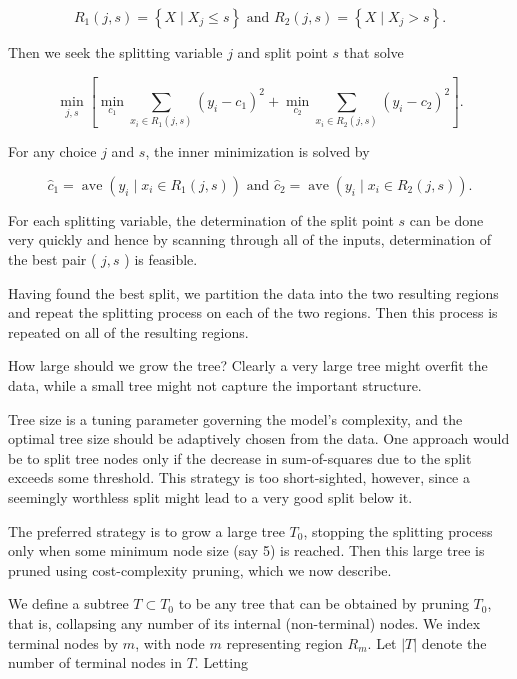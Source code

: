 \documentclass[10pt]{article}
\begin{document}
\begin{equation*}
R_{1}(j, s)=\left\{X \mid X_{j} \leq s\right\} \text { and } R_{2}(j, s)=\left\{X \mid X_{j}>s\right\} . \tag{9.12}
\end{equation*}


Then we seek the splitting variable $j$ and split point $s$ that solve


\begin{equation*}
\min _{j, s}\left[\min _{c_{1}} \sum_{x_{i} \in R_{1}(j, s)}\left(y_{i}-c_{1}\right)^{2}+\min _{c_{2}} \sum_{x_{i} \in R_{2}(j, s)}\left(y_{i}-c_{2}\right)^{2}\right] . \tag{9.13}
\end{equation*}


For any choice $j$ and $s$, the inner minimization is solved by


\begin{equation*}
\hat{c}_{1}=\operatorname{ave}\left(y_{i} \mid x_{i} \in R_{1}(j, s)\right) \text { and } \hat{c}_{2}=\operatorname{ave}\left(y_{i} \mid x_{i} \in R_{2}(j, s)\right) . \tag{9.14}
\end{equation*}


For each splitting variable, the determination of the split point $s$ can be done very quickly and hence by scanning through all of the inputs, determination of the best pair ( $j, s$ ) is feasible.

Having found the best split, we partition the data into the two resulting regions and repeat the splitting process on each of the two regions. Then this process is repeated on all of the resulting regions.

How large should we grow the tree? Clearly a very large tree might overfit the data, while a small tree might not capture the important structure.

Tree size is a tuning parameter governing the model's complexity, and the optimal tree size should be adaptively chosen from the data. One approach would be to split tree nodes only if the decrease in sum-of-squares due to the split exceeds some threshold. This strategy is too short-sighted, however, since a seemingly worthless split might lead to a very good split below it.

The preferred strategy is to grow a large tree $T_{0}$, stopping the splitting process only when some minimum node size (say 5) is reached. Then this large tree is pruned using cost-complexity pruning, which we now describe.

We define a subtree $T \subset T_{0}$ to be any tree that can be obtained by pruning $T_{0}$, that is, collapsing any number of its internal (non-terminal) nodes. We index terminal nodes by $m$, with node $m$ representing region $R_{m}$. Let $|T|$ denote the number of terminal nodes in $T$. Letting
\end{document}
